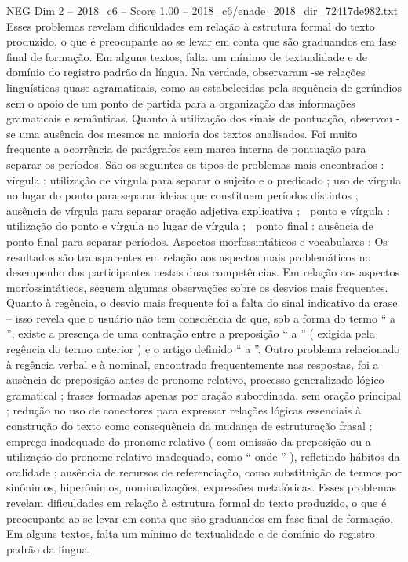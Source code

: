 \begin{textsample}{NEG Dim 2 – 2018\_c6 – Score 1.00 – 2018\_c6/enade\_2018\_dir\_72417de982.txt}
Esses problemas revelam dificuldades em relação à estrutura formal do texto produzido, o que é preocupante ao se levar em conta que são graduandos em fase final de formação.
Em alguns textos, falta um mínimo de textualidade e de domínio do registro padrão da língua.
Na verdade, observaram -se relações linguísticas quase agramaticais, como as estabelecidas pela sequência de gerúndios sem o apoio de um ponto de partida para a organização das informações gramaticais e semânticas.
Quanto à utilização dos sinais de pontuação, observou -se uma ausência dos mesmos na maioria dos textos analisados.
Foi muito frequente a ocorrência de parágrafos sem marca interna de pontuação para separar os períodos.
São os seguintes os tipos de problemas mais encontrados :  vírgula : utilização de vírgula para separar o sujeito e o predicado ; uso de vírgula no lugar do ponto para separar ideias que constituem períodos distintos ; ausência de vírgula para separar oração adjetiva explicativa ;  ponto e vírgula : utilização do ponto e vírgula no lugar de vírgula ;  ponto final : ausência de ponto final para separar períodos.
Aspectos morfossintáticos e vocabulares : Os resultados são transparentes em relação aos aspectos mais problemáticos no desempenho dos participantes nestas duas competências.
Em relação aos aspectos morfossintáticos, seguem algumas observações sobre os desvios mais frequentes.
Quanto à regência, o desvio mais frequente foi a falta do sinal indicativo da crase – isso revela que o usuário não tem consciência de que, sob a forma do termo “ a ”, existe a presença de uma contração entre a preposição “ a ” ( exigida pela regência do termo anterior ) e o artigo definido “ a ”.
Outro problema relacionado à regência verbal e à nominal, encontrado frequentemente nas respostas, foi a ausência de preposição antes de pronome relativo, processo generalizado lógico-gramatical ; frases formadas apenas por oração subordinada, sem oração principal ; redução no uso de conectores para expressar relações lógicas essenciais à construção do texto como consequência da mudança de estruturação frasal ; emprego inadequado do pronome relativo ( com omissão da preposição ou a utilização do pronome relativo inadequado, como “ onde ” ), refletindo hábitos da oralidade ; ausência de recursos de referenciação, como substituição de termos por sinônimos, hiperônimos, nominalizações, expressões metafóricas.
Esses problemas revelam dificuldades em relação à estrutura formal do texto produzido, o que é preocupante ao se levar em conta que são graduandos em fase final de formação.
Em alguns textos, falta um mínimo de textualidade e de domínio do registro padrão da língua.

\end{textsample}
